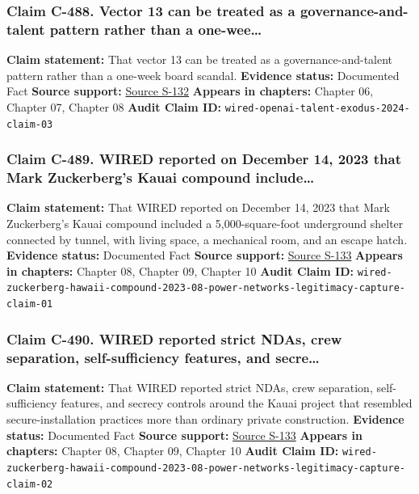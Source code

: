 \documentclass[
  american,
  11pt,
  letterpaper,
]{article}
\begin{document}
\subsubsection{Claim C-488. Vector 13 can be treated as a
governance-and-talent pattern rather than a
one-wee\ldots{}}\label{claim-c-488-vector-13-can-be-treated-as-a-governance-and-talent-pattern-rather-than-a-one-wee}

\textbf{Claim statement:} That vector 13 can be treated as a
governance-and-talent pattern rather than a one-week board scandal.
\textbf{Evidence status:} Documented Fact \textbf{Source support:}
\hyperref[source-s-132-the-openai-talent-exodus-gives-rivals-an-opening]{Source
S-132} \textbf{Appears in chapters:} Chapter 06, Chapter 07, Chapter 08
\textbf{Audit Claim ID:}
\texttt{wired-openai-talent-exodus-2024-claim-03}

\subsubsection{Claim C-489. WIRED reported on December 14, 2023 that
Mark Zuckerberg's Kauai compound
include\ldots{}}\label{claim-c-489-wired-reported-on-december-14-2023-that-mark-zuckerberg-s-kauai-compound-include}

\textbf{Claim statement:} That WIRED reported on December 14, 2023 that
Mark Zuckerberg's Kauai compound included a 5,000-square-foot
underground shelter connected by tunnel, with living space, a mechanical
room, and an escape hatch. \textbf{Evidence status:} Documented Fact
\textbf{Source support:}
\hyperref[source-s-133-inside-mark-zuckerbergs-top-secret-hawaii-compound]{Source
S-133} \textbf{Appears in chapters:} Chapter 08, Chapter 09, Chapter 10
\textbf{Audit Claim ID:}
\texttt{wired-zuckerberg-hawaii-compound-2023-08-power-networks-legitimacy-capture-claim-01}

\subsubsection{Claim C-490. WIRED reported strict NDAs, crew separation,
self-sufficiency features, and
secre\ldots{}}\label{claim-c-490-wired-reported-strict-ndas-crew-separation-self-sufficiency-features-and-secre}

\textbf{Claim statement:} That WIRED reported strict NDAs, crew
separation, self-sufficiency features, and secrecy controls around the
Kauai project that resembled secure-installation practices more than
ordinary private construction. \textbf{Evidence status:} Documented Fact
\textbf{Source support:}
\hyperref[source-s-133-inside-mark-zuckerbergs-top-secret-hawaii-compound]{Source
S-133} \textbf{Appears in chapters:} Chapter 08, Chapter 09, Chapter 10
\textbf{Audit Claim ID:}
\texttt{wired-zuckerberg-hawaii-compound-2023-08-power-networks-legitimacy-capture-claim-02}
\end{document}
